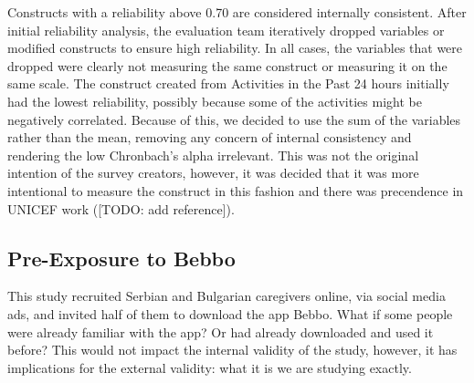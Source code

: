 \documentclass{article}
\begin{document}
Constructs with a reliability above 0.70 are considered internally consistent. After initial reliability analysis, the evaluation team iteratively dropped variables or modified constructs to ensure high reliability. In all cases, the variables that were dropped were clearly not measuring the same construct or measuring it on the same scale. The construct created from Activities in the Past 24 hours initially had the lowest reliability, possibly because some of the activities might be negatively correlated. Because of this, we decided to use the sum of the variables rather than the mean, removing any concern of internal consistency and rendering the low Chronbach's alpha irrelevant. This was not the original intention of the survey creators, however, it was decided that it was more intentional to measure the construct in this fashion and there was precendence in UNICEF work ([TODO: add reference]).













\subsection*{Pre-Exposure to Bebbo}

This study recruited Serbian and Bulgarian caregivers online, via social media ads, and invited half of them to download the app Bebbo. What if some people were already familiar with the app? Or had already downloaded and used it before? This would not impact the internal validity of the study, however, it has implications for the external validity: what it is we are studying exactly.
\end{document}
